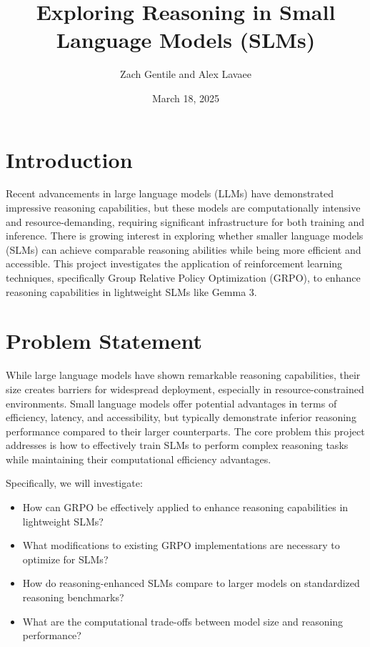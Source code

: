 \documentclass[11pt, oneside]{article}   	%
\title{Exploring Reasoning in Small Language Models (SLMs)}
\author{Zach Gentile and Alex Lavaee}
\date{March 18, 2025}
\begin{document}
\maketitle

\section*{Introduction}

Recent advancements in large language models (LLMs) have demonstrated impressive reasoning capabilities, but these models are computationally intensive and resource-demanding, requiring significant infrastructure for both training and inference. There is growing interest in exploring whether smaller language models (SLMs) can achieve comparable reasoning abilities while being more efficient and accessible. This project investigates the application of reinforcement learning techniques, specifically Group Relative Policy Optimization (GRPO), to enhance reasoning capabilities in lightweight SLMs like Gemma 3.

\section*{Problem Statement}

While large language models have shown remarkable reasoning capabilities, their size creates barriers for widespread deployment, especially in resource-constrained environments. Small language models offer potential advantages in terms of efficiency, latency, and accessibility, but typically demonstrate inferior reasoning performance compared to their larger counterparts. The core problem this project addresses is how to effectively train SLMs to perform complex reasoning tasks while maintaining their computational efficiency advantages.

Specifically, we will investigate:
\begin{itemize}
	\item How can GRPO be effectively applied to enhance reasoning capabilities in lightweight SLMs?
	\item What modifications to existing GRPO implementations are necessary to optimize for SLMs?
	\item How do reasoning-enhanced SLMs compare to larger models on standardized reasoning benchmarks?
	\item What are the computational trade-offs between model size and reasoning performance?
\end{itemize}
\end{document}
